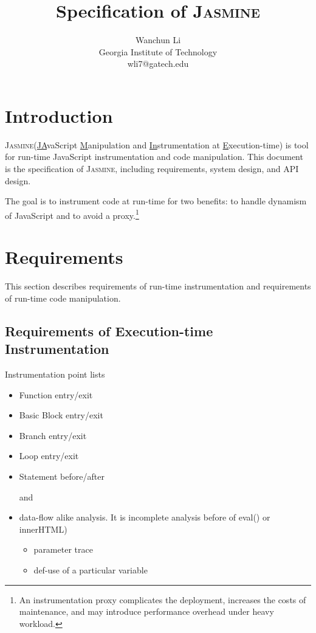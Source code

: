 \documentclass[a4paper,twocolumn,10pt]{article}
\newcommand{\jasmine}{{\textsc{Jasmine}}\xspace}
\def\denseitems{
  \itemsep1pt plus1pt minus1pt
  \parsep0pt plus0pt
  \parskip0pt\topsep0pt}
\begin{document}
\date{}

\title{\Large \bf Specification of \jasmine}
\author{
{\rm Wanchun Li}\\
Georgia Institute of Technology\\
wli7@gatech.edu
}

\maketitle
\pagestyle{plain}

\section{Introduction}
\jasmine (\underline{JA}vaScript \underline{M}anipulation and \underline{In}strumentation at \underline{E}xecution-time) is tool for run-time JavaScript instrumentation and code manipulation. This document is the specification of \jasmine, including requirements, system design, and API design.

The goal is to instrument code at run-time for two benefits: to handle dynamism of JavaScript and to avoid a proxy.\footnote{An instrumentation proxy complicates the deployment, increases the costs of maintenance, and may introduce performance overhead under heavy workload.}

\section{Requirements}
This section describes requirements of run-time instrumentation and requirements of run-time code manipulation.
\subsection{Requirements of Execution-time Instrumentation}
Instrumentation point lists
\begin{itemize}\denseitems
  \item Function entry/exit
  \item Basic Block entry/exit
  \item Branch entry/exit
  \item Loop entry/exit
  \item Statement before/after

\noindent and
  \item data-flow alike analysis. It is incomplete analysis before of eval() or innerHTML)
  \begin{itemize}\denseitems
    \item parameter trace
    \item def-use of a particular variable
  \end{itemize}
\end{itemize}
\end{document}
